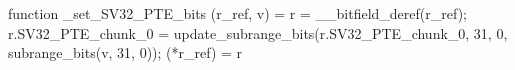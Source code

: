 function _set_SV32_PTE_bits (r_ref, v) = {
    r = __bitfield_deref(r_ref);
    r.SV32_PTE_chunk_0 = update_subrange_bits(r.SV32_PTE_chunk_0, 31, 0, subrange_bits(v, 31, 0));
    (*r_ref) = r
}
